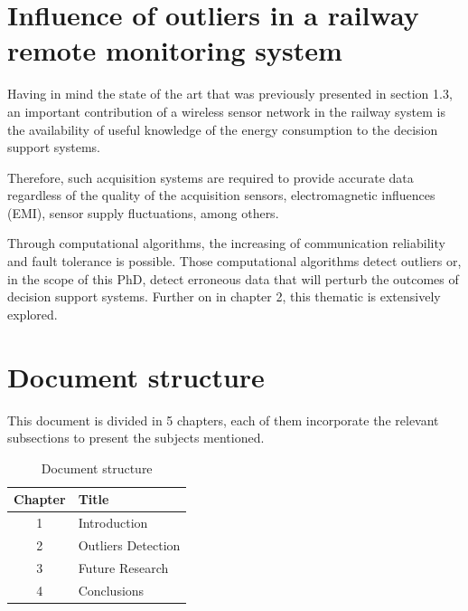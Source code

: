 \section{Influence of outliers in a railway remote monitoring system}

Having in mind the state of the art that was previously presented in section 1.3, an important contribution of a wireless sensor network in the railway system is the availability of useful knowledge of the energy consumption to the decision support systems.

Therefore, such acquisition systems are required to provide accurate data regardless of the quality of the acquisition sensors, electromagnetic influences (EMI), sensor supply fluctuations, among others.

Through computational algorithms, the increasing of communication reliability and fault tolerance is possible. Those computational algorithms detect outliers or, in the scope of this PhD, detect erroneous data that will perturb the outcomes of decision support systems. Further on in chapter 2, this thematic is extensively explored.

\section{Document structure}

This document is divided in 5 chapters, each of them incorporate the relevant subsections to present the subjects mentioned. 

\begin{table}[!h]
    \label{tb:struct}
    \centering
    \caption{Document structure}
    \vspace{0.2em}
    \begin{tabular}{c|l}%
    \textbf{Chapter} & \textbf{Title}                    \\ \hline
    1       &                   Introduction             \\ \hline
    2       &                   Outliers Detection    \\ \hline
    3       &                   Future Research    \\ \hline
    4       &                   Conclusions               \\
    \end{tabular}
\end{table}